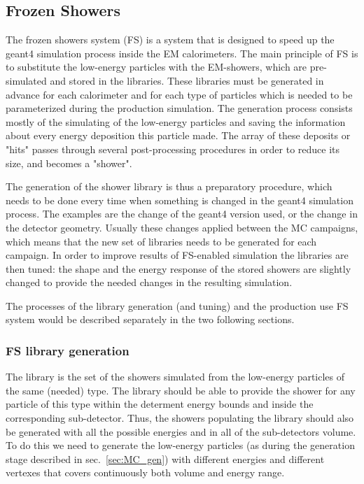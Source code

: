 \subsection{Frozen Showers}
\label{sec:MC_FS}
The frozen showers system (FS) is a system that is designed to speed up the geant4 simulation process inside the EM calorimeters. The main principle of FS is to substitute the low-energy particles with the EM-showers, which are pre-simulated and stored in the libraries. These libraries must be generated in advance for each calorimeter and for each type of particles which is needed to be parameterized during the production simulation. The generation process consists mostly of the simulating of the low-energy particles and saving the information about every energy deposition this particle made. The array of these deposits or "hits" passes through several post-processing procedures in order to reduce its size, and becomes a "shower".


The generation of the shower library is thus a preparatory procedure, which needs to be done every time when something is changed in the geant4 simulation process. The examples are the change of the geant4 version used, or the change in the detector geometry. Usually these changes applied between the MC campaigns, which means that the new set of libraries needs to be generated for each campaign. In order to improve results of FS-enabled simulation the libraries are then tuned: the shape and the energy response of the stored showers are slightly changed to provide the needed changes in the resulting simulation.

The processes of the library generation (and tuning) and the production use FS system would be described separately in the two following sections.

\subsubsection{FS library generation}
\label{sec:MC_FS_gen}

The library is the set of the showers simulated from the low-energy particles of the same (needed) type. The library should be able to provide the shower for any particle of this type within the determent energy bounds and inside the corresponding sub-detector. Thus, the showers populating the library should also be generated with all the possible energies and in all of the sub-detectors volume. To do this we need to generate the low-energy particles (as during the generation stage described in sec.~\ref{sec:MC_gen}) with different energies and different vertexes that covers continuously both volume and energy range.

